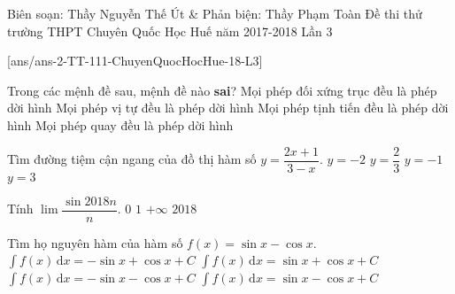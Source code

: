 	\begin{name}
{Biên soạn: Thầy Nguyễn Thế Út \& Phản biện: Thầy Phạm Toàn }
		{Đề thi thử trường THPT Chuyên Quốc Học Huế
năm 2017-2018 Lần 3}
	\end{name}
	\setcounter{ex}{0}
	[ans/ans-2-TT-111-ChuyenQuocHocHue-18-L3]

\begin{ex}%
	Trong các mệnh đề sau, mệnh đề nào \textbf{sai}?
	\choice
	{Mọi phép đối xứng trục đều là phép dời hình}
	{\True Mọi phép vị tự đều là phép dời hình}
	{Mọi phép tịnh tiến đều là phép dời hình}
	{Mọi phép quay đều là phép dời hình}
\end{ex}

\begin{ex}%
	Tìm đường tiệm cận ngang của đồ thị hàm số $y = \dfrac{2x+1}{3-x}$.
	\choice
	{\True $y=-2$}
	{$y=\dfrac{2}{3}$}
	{$y=-1$}
	{$y=3$}
\end{ex}

\begin{ex}%
	Tính $\lim \dfrac{\sin 2018n}{n}$.
	\choice
	{\True $0$}
	{$1$}
	{$+ \infty$}
	{$2018$}
\end{ex}

\begin{ex}%
	Tìm họ nguyên hàm của hàm số $f(x) = \sin x - \cos x$.
	\choice
	{$\displaystyle \int f(x) \mathrm{\,d}x =  - \sin x + \cos x  + C$}
	{$\displaystyle \int f(x) \mathrm{\,d}x =   \sin x + \cos x  + C$}
	{\True $\displaystyle \int f(x)\mathrm{\,d}x =  - \sin x - \cos x  + C$}
	{$\displaystyle \int f(x) \mathrm{\,d} x =   \sin x - \cos x  + C$}
\end{ex}

